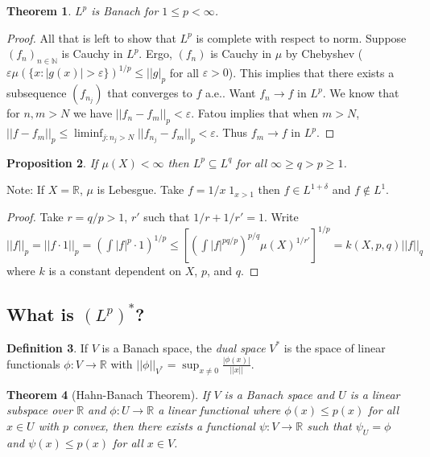 \documentclass{article}
\newtheorem{theorem}{Theorem}[section]
\newtheorem{proposition}[theorem]{Proposition}
\theoremstyle{definition}
\newtheorem{definition}[theorem]{Definition}
\begin{document}
\begin{theorem}
    $L^p$ is Banach for $1\leq p< \infty$.
\end{theorem}
\begin{proof}
    All that is left to show that $L^p$ is complete with respect to norm. Suppose $(f_n)_{n\in\mathbb{N}}$ is Cauchy in $L^p$. Ergo,
    $(f_n)$ is Cauchy in $\mu$ by Chebyshev ($\varepsilon \mu(\{x:|g(x)|>\varepsilon\})^{1/p}\leq ||g|_p$ for all $\varepsilon>0$).
    This implies that there exists a subsequence $(f_{n_j})$ that converges to $f$ a.e.. Want $f_n\to f$ in $L^p$.
    We know that for $n,m>N$ we have $||f_n-f_m||_p<\varepsilon$. Fatou implies that when $m>N$,
    $||f-f_m||_p \leq \liminf_{j:n_j>N} ||f_{n_j}-f_m||_p<\varepsilon$. Thus $f_m\to f$ in $L^p$.
\end{proof}

\begin{proposition}
    If $\mu(X)<\infty$ then $L^p\subseteq L^q$ for all $\infty\geq q>p\geq 1$.
\end{proposition}

Note: If $X=\mathbb{R}$, $\mu$ is Lebesgue. Take $f=1/x\; 1_{x>1}$ then $f\in L^{1+\delta}$ and $f\notin L^1$.

\begin{proof}
    Take $r=q/p>1$, $r'$ such that $1/r+1/r'=1$.
    Write
    $||f||_p=||f\cdot 1||_p=\left(\int |f|^p\cdot 1\right)^{1/p}\leq \left[\left(\int|f|^{pq/p}\right)^{p/q}\mu(X)^{1/r'} \right]^{1/p}=k(X,p,q)||f||_q$
    where $k$ is a constant dependent on $X$, $p$, and $q$.
\end{proof}

\subsection{What is $(L^p)^*$?}

\begin{definition}
    If $V$ is a Banach space, the \textit{dual space} $V^*$ is the space of linear functionals $\phi:V\rightarrow\mathbb{R}$ with
    $||\phi||_{V^*}=\sup_{x\neq 0}\frac{|\phi(x)|}{||x||}$.
\end{definition}

\begin{theorem}[Hahn-Banach Theorem]
    If $V$ is a Banach space and $U$ is a linear subspace over $\mathbb{R}$ and $\phi:U\rightarrow\mathbb{R}$ a linear functional
    where $\phi(x)\leq p(x)$ for all $x\in U$ with $p$ convex, then there exists a functional $\psi:V\rightarrow\mathbb{R}$ such that
    $\psi_U=\phi$ and $\psi(x)\leq p(x)$ for all $x\in V$. 
\end{theorem}
\end{document}
